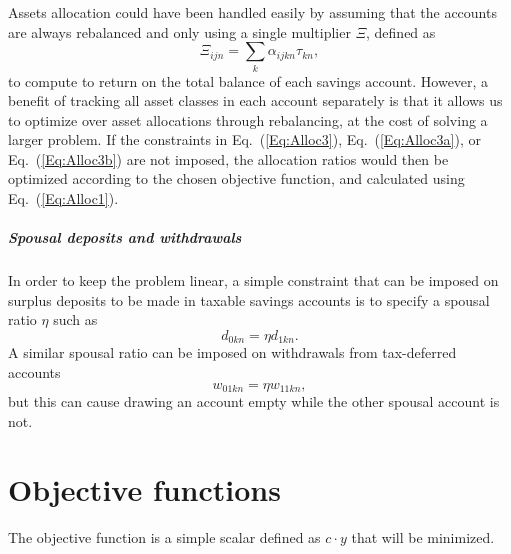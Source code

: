 \documentclass{report}[fleqn,12pt]
\begin{document}
Assets allocation could have been handled easily by assuming that
the accounts are always rebalanced
and only using a single multiplier $\Xi$, defined as
\begin{equation}
	\Xi_{ijn} = \sum_k \alpha_{ijkn}\tau_{kn},
\end{equation}
to compute to return
on the total balance of each savings account.
However, a benefit of tracking all asset classes in each account separately
is that it allows us to optimize over asset allocations through rebalancing, at
the cost of solving a larger problem. If the constraints in Eq.~(\ref{Eq:Alloc3}),
Eq.~(\ref{Eq:Alloc3a}), or Eq.~(\ref{Eq:Alloc3b})
are not imposed, the allocation ratios would then be optimized according to
the chosen objective function, and calculated using Eq.~(\ref{Eq:Alloc1}).

\paragraph*{Spousal deposits and withdrawals}
In order to keep the problem linear, a simple constraint that can be imposed on
surplus deposits to be made in taxable savings accounts is to specify a spousal ratio $\eta$
such as
\begin{equation}
	d_{0kn} = \eta d_{1kn}.
\end{equation}
A similar spousal ratio can be imposed on withdrawals from tax-deferred accounts
\begin{equation}
	w_{01kn} = \eta w_{11kn},
\end{equation}
but this can cause drawing an account empty while the other spousal account is not.

\chapter{Objective functions}
The objective function is a simple scalar defined as $c\cdot y$ that will be minimized.
\end{document}
